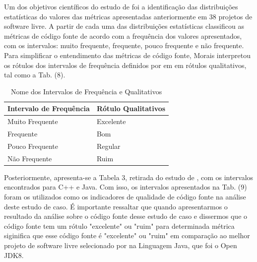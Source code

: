  \vspace{\onelineskip} 

Um dos objetivos científicos do estudo de  foi a identificação das distribuições estatísticas do valores das métricas apresentadas anteriormente em 38 projetos
de software livre. A partir de cada uma das distribuições estatísticas  classificou as métricas de código fonte de acordo com a frequência dos valores apresentados,
com os intervalos: muito frequente, frequente, pouco frequente e não frequente. Para simplificar o entendimento das métricas de código fonte, Morais interpretou os rótulos dos
intervalos de frequência definidos por  em em rótulos qualitativos, tal como a Tab. (8). 

\begin{table}[!ht]
	\begin{center}
	 \begin{tabular}{|l|l|}
		\hline
		\textbf{Intervalo de Frequência} & \textbf{Rótulo Qualitativos} \\ \hline
		Muito Frequente & Excelente \\ \hline
		Frequente       & Bom       \\ \hline
		Pouco Frequente & Regular   \\ \hline
		Não Frequente   & Ruim      \\ \hline
		\end{tabular}
		\caption{Nome dos Intervalos de Frequência e Qualitativos}
		\label{nomes}
		\end{center}
		\end{table}


Posteriormente, apresenta-se a Tabela 3, retirada do
estudo de , com os intervalos encontrados para C++ e Java. Com isso, os intervalos apresentados na Tab. (9) foram os utilizados como os indicadores
de qualidade de código fonte na análise deste estudo de caso. É importante ressaltar que quando apresentarmos o resultado da análise sobre o código fonte desse estudo de caso e dissermos que o código fonte tem um rótulo "excelente" ou "ruim" para determinada métrica siginifica que esse código fonte é "excelente" ou "ruim" em comparação ao melhor projeto de software livre selecionado por  na Linguagem Java, que foi o Open JDK8.

 \vspace{\onelineskip} 
 \vspace{\onelineskip} 
 \vspace{\onelineskip} 
 \vspace{\onelineskip} 
 \vspace{\onelineskip} 

